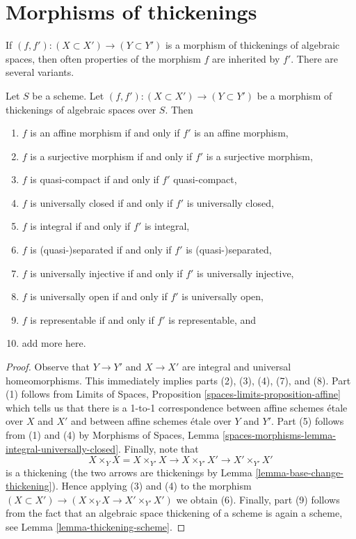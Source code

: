 \section{Morphisms of thickenings}
\label{section-morphisms-thickenings}

\noindent
If $(f, f') : (X \subset X') \to (Y \subset Y')$ is a morphism
of thickenings of algebraic spaces, then often properties of the morphism
$f$ are inherited by $f'$. There are several variants.

\begin{lemma}
\label{lemma-thicken-property-morphisms}
Let $S$ be a scheme. Let $(f, f') : (X \subset X') \to (Y \subset Y')$
be a morphism of thickenings of algebraic spaces over $S$. Then
\begin{enumerate}
\item $f$ is an affine morphism if and only if $f'$ is an affine morphism,
\item $f$ is a surjective morphism if and only if $f'$ is a surjective morphism,
\item $f$ is quasi-compact if and only if $f'$ quasi-compact,
\item $f$ is universally closed if and only if $f'$ is universally closed,
\item $f$ is integral if and only if $f'$ is integral,
\item $f$ is (quasi-)separated if and only if $f'$ is (quasi-)separated,
\item $f$ is universally injective if and only if $f'$ is universally injective,
\item $f$ is universally open if and only if $f'$ is universally open,
\item $f$ is representable if and only if $f'$ is representable, and
\item add more here.
\end{enumerate}
\end{lemma}

\begin{proof}
Observe that $Y \to Y'$ and $X \to X'$ are integral and
universal homeomorphisms. This immediately implies parts
(2), (3), (4), (7), and (8).
Part (1) follows from
Limits of Spaces, Proposition \ref{spaces-limits-proposition-affine}
which tells us that there is a 1-to-1 correspondence between
affine schemes \'etale over $X$ and $X'$ and between affine schemes
\'etale over $Y$ and $Y'$.
Part (5) follows from (1) and (4) by
Morphisms of Spaces, Lemma
\ref{spaces-morphisms-lemma-integral-universally-closed}.
Finally, note that
$$
X \times_Y X = X \times_{Y'} X \to X \times_{Y'} X' \to X' \times_{Y'} X'
$$
is a thickening (the two arrows are thickenings by
Lemma \ref{lemma-base-change-thickening}).
Hence applying (3) and (4) to the morphism
$(X \subset X') \to (X \times_Y X \to X' \times_{Y'} X')$
we obtain (6). Finally, part (9) follows from the fact that an
algebraic space thickening of a scheme is again a scheme, see
Lemma \ref{lemma-thickening-scheme}.
\end{proof}

